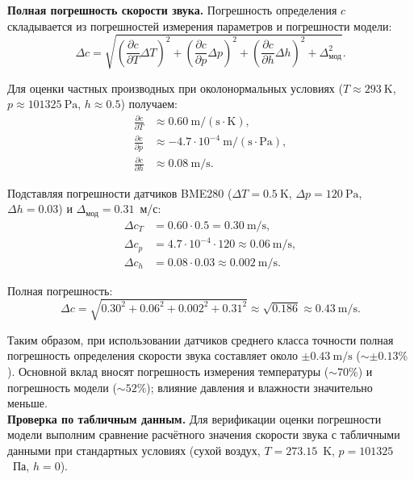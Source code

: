 \documentclass[a4paper,11pt]{article} %
\begin{document}
\textbf{Полная погрешность скорости звука.}
Погрешность определения $c$ складывается из погрешностей измерения параметров и погрешности модели:
\begin{equation}\label{eq:error-propagation}
    \Delta c = \sqrt{\left(\frac{\partial c}{\partial T}\Delta T\right)^2 + \left(\frac{\partial c}{\partial p}\Delta p\right)^2 + \left(\frac{\partial c}{\partial h}\Delta h\right)^2 + \Delta_{\text{мод}}^2}.
\end{equation}

Для оценки частных производных при околонормальных условиях ($T \approx 293\ \mathrm{K}$, $p \approx 101325\ \mathrm{Pa}$, $h \approx 0.5$) получаем:
\begin{align}
    \frac{\partial c}{\partial T} &\approx 0.60\ \mathrm{m/(s\cdot K)}, \\
    \frac{\partial c}{\partial p} &\approx -4.7 \cdot 10^{-4}\ \mathrm{m/(s\cdot Pa)}, \\
    \frac{\partial c}{\partial h} &\approx 0.08\ \mathrm{m/s}.
\end{align}

Подставляя погрешности датчиков BME280 ($\Delta T = 0.5\ \mathrm{K}$, $\Delta p = 120\ \mathrm{Pa}$, $\Delta h = 0.03$) и $\Delta_{\text{мод}} = 0.31$~м/с:
\begin{align}
    \Delta c_T &= 0.60 \cdot 0.5 = 0.30\ \mathrm{m/s}, \\
    \Delta c_p &= 4.7 \cdot 10^{-4} \cdot 120 \approx 0.06\ \mathrm{m/s}, \\
    \Delta c_h &= 0.08 \cdot 0.03 \approx 0.002\ \mathrm{m/s}.
\end{align}

Полная погрешность:
\begin{equation}
    \Delta c = \sqrt{0.30^2 + 0.06^2 + 0.002^2 + 0.31^2} \approx \sqrt{0.186} \approx 0.43\ \mathrm{m/s}.
\end{equation}

Таким образом, при использовании датчиков среднего класса точности полная погрешность определения скорости звука составляет около $\pm 0.43\ \mathrm{m/s}$ ($\sim \pm 0.13\%$). Основной вклад вносят погрешность измерения температуры ($\sim 70\%$) и погрешность модели ($\sim 52\%$); влияние давления и влажности значительно меньше.
\\

\textbf{Проверка по табличным данным.}
Для верификации оценки погрешности модели выполним сравнение расчётного значения скорости звука с табличными данными при стандартных условиях (сухой воздух, $T = 273.15$~K, $p = 101325$~Па, $h = 0$).
\end{document}
